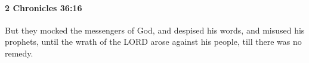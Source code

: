 
		\paragraph{2 Chronicles 36:16} %
			\label{2CHRONICLES-36-16}

			But they mocked the messengers of God, and despised his words, and misused his prophets, until the wrath of the LORD arose against his people, till there was no remedy.



